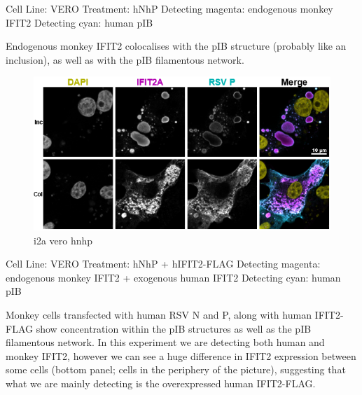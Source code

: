 Cell Line: VERO \newline
Treatment: hNhP \newline
Detecting magenta: endogenous monkey IFIT2 \newline
Detecting cyan: human pIB \newline

Endogenous monkey IFIT2 colocalises with the pIB structure (probably like an inclusion), as well as with the pIB filamentous network.

\begin{figure}
    \centering
    \includegraphics[width=1\linewidth]{09. Chapter 4//Figs//01. I2A/02. i2a vero hnhp.png}
    \caption[i2a vero hnhp]{i2a vero hnhp}
    \label{i2a vero hnhp}
\end{figure}

Cell Line: VERO \newline
Treatment: hNhP + hIFIT2-FLAG \newline
Detecting magenta: endogenous monkey IFIT2 + exogenous human IFIT2 \newline
Detecting cyan: human pIB \newline

Monkey cells transfected with human RSV N and P, along with human IFIT2-FLAG show concentration within the pIB structures as well as the pIB filamentous network. In this experiment we are detecting both human and monkey IFIT2, however we can see a huge difference in IFIT2 expression between some cells (bottom panel; cells in the periphery of the picture), suggesting that what we are mainly detecting is the overexpressed human IFIT2-FLAG.

